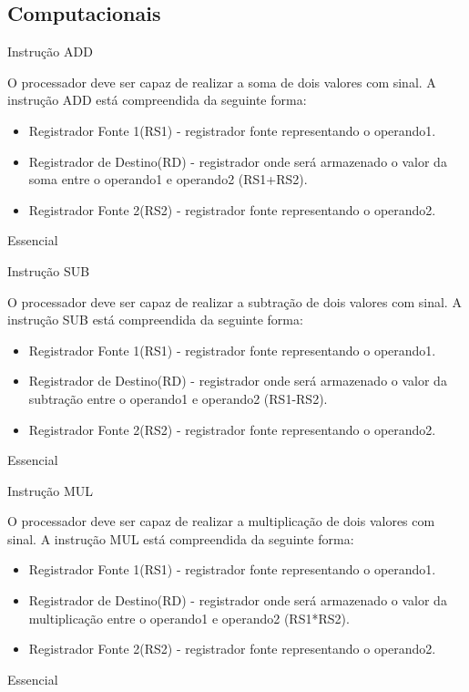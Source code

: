 \documentclass{article}
\begin{document}
    \subsection{Computacionais}
    \begin{functional}
    
     \requirement
      {Instrução ADD}
      {O processador deve ser capaz de realizar a soma de dois valores com sinal.
      A instrução ADD está compreendida da seguinte forma:
       \begin{itemize}
        \item Registrador Fonte 1(RS1) - registrador fonte representando o operando1.
        \item Registrador de Destino(RD) - registrador onde será armazenado o valor da soma entre o operando1 e operando2 (RS1+RS2).
        \item Registrador Fonte 2(RS2) - registrador fonte representando o operando2.
       \end{itemize}}
      {Essencial}
    
     \requirement
      {Instrução SUB}
      {O processador deve ser capaz de realizar a subtração de dois valores com sinal.
      A instrução SUB está compreendida da seguinte forma:
       \begin{itemize}
        \item Registrador Fonte 1(RS1) - registrador fonte representando o operando1.
        \item Registrador de Destino(RD) - registrador onde será armazenado o valor da subtração entre o operando1 e operando2 (RS1-RS2).
        \item Registrador Fonte 2(RS2) - registrador fonte representando o operando2.
       \end{itemize}}
      {Essencial}
      
      \requirement
      {Instrução MUL}
      {O processador deve ser capaz de realizar a multiplicação de dois valores com sinal.
      A instrução MUL está compreendida da seguinte forma:
       \begin{itemize}
        \item Registrador Fonte 1(RS1) - registrador fonte representando o operando1.
        \item Registrador de Destino(RD) - registrador onde será armazenado o valor da multiplicação entre o operando1 e operando2 (RS1*RS2).
        \item Registrador Fonte 2(RS2) - registrador fonte representando o operando2.
       \end{itemize}}
      {Essencial}
      

\end{functional}
\end{document}
